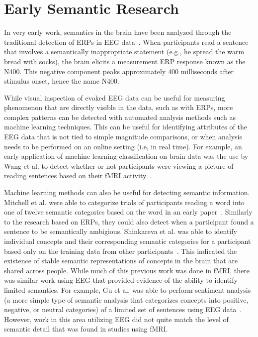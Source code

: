 \label{chapter:relatedwork}

\nocite{*}

\section{Early Semantic Research}

In very early work, semantics in the brain have been analyzed through the 
traditional detection of ERPs in EEG 
data~\cite{kutas1980reading,kuperberg2007neural}. When participants read a 
sentence that involves a semantically inappropriate statement (e.g., he spread 
the warm bread with socks), the brain elicits a measurement ERP response known 
as the N400. This negative component peaks approximately 400 milliseconds after 
stimulus onset, hence the name N400.

While visual inspection of evoked EEG data can be useful for measuring 
phenomenon that are directly visible in the data, such as with ERPs, more 
complex patterns can be detected with automated analysis methods such as 
machine learning techniques. This can be useful for identifying attributes of 
the EEG data that is not tied to simple magnitude comparisons, or when analysis 
needs to be performed on an online setting (i.e, in real time). For example, an 
early application of machine learning classification on brain data was the use 
by Wang et al. to detect whether or not participants were viewing a picture of 
reading sentences based on their fMRI activity~\cite{Wang2002}. 

Machine learning methods can also be useful for detecting semantic information.  
Mitchell et al. were able to categorize trials of participants reading a word 
into one of twelve semantic categories based on the word in an early 
paper~\cite{Mitchell2002}. Similarly to the research based on ERPs, they could 
also detect when a participant found a sentence to be semantically ambigious. 
Shinkareva et al. was able to identify individual concepts and their 
corresponding semantic categories for a participant based only on the training 
data from other participants~\cite{Shinkareva2008}. This indicated the 
existence of stable semantic representations of concepts in the brain that are 
shared across people. While much of this previous work was done in fMRI, there 
was similar work using EEG that provided evidence of the ability to identify 
limited semantics. For example, Gu et al. was able to perform sentiment 
analysis (a more simple type of semantic analysis that categorizes concepts 
into positive, negative, or neutral categories) of a limited set of sentences 
using EEG data~\cite{Gu2014}. However, work in this area utilizing EEG did not 
quite match the level of semantic detail that was found in studies using fMRI.

